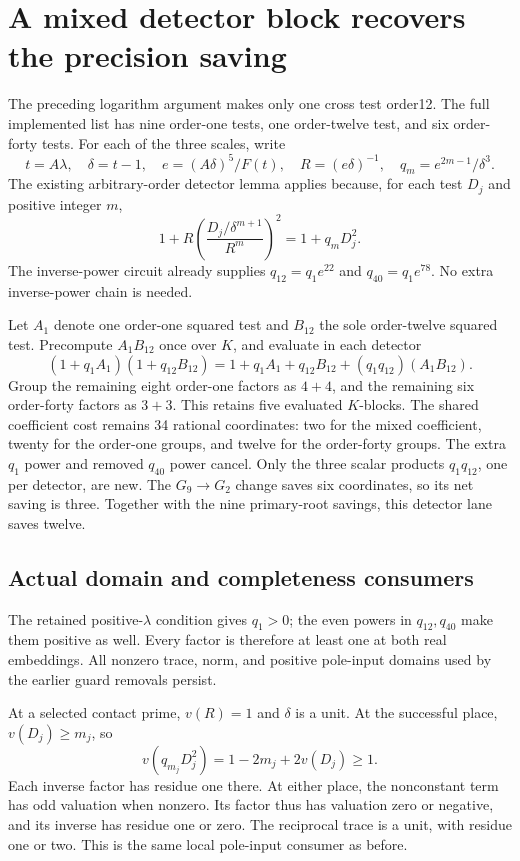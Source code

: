 \section{A mixed detector block recovers the precision saving}

The preceding logarithm argument makes only one cross test order12.
The full implemented list has nine order-one tests, one order-twelve test,
and six order-forty tests. For each of the three scales, write
\[
 t=A\lambda,\quad\delta=t-1,\quad
 e=(A\delta)^5/F(t),\quad R=(e\delta)^{-1},\quad
 q_m=e^{2m-1}/\delta^3.
\]
The existing arbitrary-order detector lemma applies because, for each
test $D_j$ and positive integer $m$,
\[
 1+R\left(\frac{D_j/\delta^{m+1}}{R^m}\right)^2
       =1+q_mD_j^2.
\]
The inverse-power circuit already supplies $q_{12}=q_1e^{22}$ and
$q_{40}=q_1e^{78}$. No extra inverse-power chain is needed.

Let $A_1$ denote one order-one squared test and $B_{12}$ the sole
order-twelve squared test. Precompute $A_1B_{12}$ once over $K$, and
evaluate in each detector
\[
 (1+q_1A_1)(1+q_{12}B_{12})
  =1+q_1A_1+q_{12}B_{12}+(q_1q_{12})(A_1B_{12}).
\]
Group the remaining eight order-one factors as $4+4$, and the remaining
six order-forty factors as $3+3$. This retains five evaluated $K$-blocks.
The shared coefficient cost remains 34 rational coordinates: two for the
mixed coefficient, twenty for the order-one groups, and twelve for the
order-forty groups. The extra $q_1$ power and removed $q_{40}$ power cancel.
Only the three scalar products $q_1q_{12}$, one per detector, are new.
The $G_9\to G_2$ change saves six coordinates, so its net saving is three.
Together with the nine primary-root savings, this detector lane saves twelve.

\subsection{Actual domain and completeness consumers}

The retained positive-$\lambda$ condition gives $q_1>0$; the even powers
in $q_{12},q_{40}$ make them positive as well. Every factor is therefore
at least one at both real embeddings. All nonzero trace, norm, and
positive pole-input domains used by the earlier guard removals persist.

At a selected contact prime, $v(R)=1$ and $\delta$ is a unit. At the
successful place, $v(D_j)\ge m_j$, so
\[
 v(q_{m_j}D_j^2)=1-2m_j+2v(D_j)\ge1.
\]
Each inverse factor has residue one there. At either place, the
nonconstant term has odd valuation when nonzero. Its factor thus has
valuation zero or negative, and its inverse has residue one or zero.
The reciprocal trace is a unit, with residue one or two. This is the
same local pole-input consumer as before.

